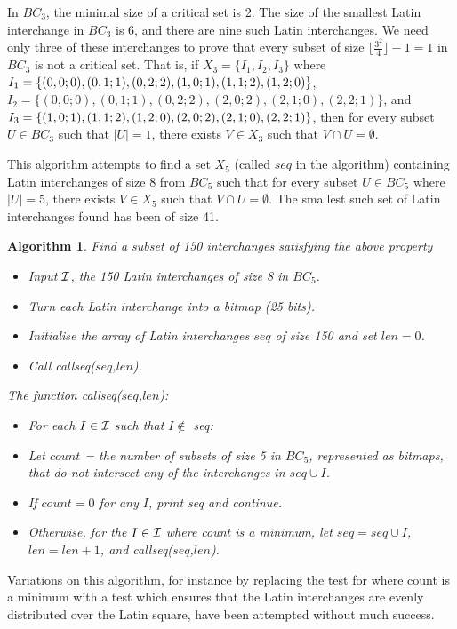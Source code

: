 \documentclass[12pt]{report}
\newtheorem{algorithm}{Algorithm}
\begin{document}
In $BC_3$, the minimal size of a critical set is 2.  The size of the
smallest Latin interchange in $BC_3$ is 6, and there are nine such Latin interchanges.
We need only three of these interchanges to prove that every subset
of size $\lfloor \displaystyle{\frac{3^2}{4}} \rfloor - 1 = 1$ in $BC_3$ is not a critical
set.  That is, if $X_3 = \{ I_1, I_2, I_3 \}$ where $I_1 = \{ (0,0;0),
(0,1;1), (0,2;2), (1,0;1),\break (1,1;2), (1,2;0) \}$, $I_2 = \{ (0,0;0),
(0,1;1), (0,2;2), (2,0;2), (2,1;0), (2,2;1) \}$, and $I_3 \break = \{ (1,0;1), 
(1,1;2), (1,2;0), (2,0;2), (2,1;0), (2,2;1) \}$, then for every subset
$U \in BC_3$ such that $|U| = 1$, there exists $V \in X_3$ such that 
$V \cap U = \emptyset$.

This algorithm attempts to find a set $X_5$ (called $seq$ in the algorithm)
containing Latin interchanges of size 8 from $BC_5$ such that for every
subset $U \in BC_5$ where $|U| = 5$, there exists $V \in X_5$ such that
$V \cap U = \emptyset$.  The smallest such set of Latin interchanges found has been 
of size 41.

\begin{algorithm}{Find a subset of 150 interchanges satisfying the above property}
\begin{itemize}
\item Input $\cal{I}$, the 150 Latin interchanges of size 8 in $BC_5$.
\item Turn each Latin interchange into a bitmap (25 bits).
\item Initialise the array of Latin interchanges $seq$ of size 150 and set $len = 0$.
\item Call callseq($seq$,$len$).
\end{itemize}

The function callseq($seq$,$len$):
\begin{itemize}
\item For each $I \in \cal{I}$ such that $I \not\in$ seq:
\item[-] Let $count$ = the number of subsets of size 5
in $BC_5$, represented as bitmaps, that do not intersect any of the
interchanges in $seq \cup I$.
\item If $count = 0$ for any $I$, print seq and continue.
\item Otherwise, for the $I \in \cal{I}$ where count is a minimum, let $seq = seq \cup I$, $len = len + 1$, and callseq($seq$,$len$).
\end{itemize}
\end{algorithm}

Variations on this algorithm, for instance by replacing the test
for where count is a minimum with a test which ensures that the
Latin interchanges are evenly distributed over the Latin square, have
been attempted without much success.
\end{document}

